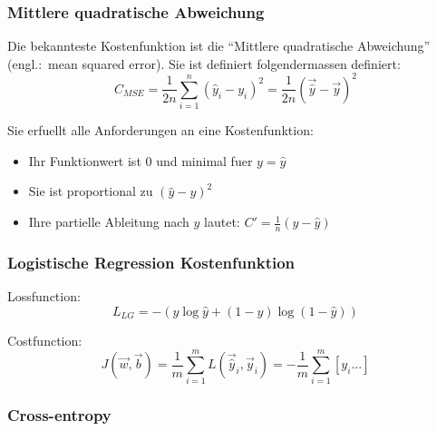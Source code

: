 \subsubsection{Mittlere quadratische Abweichung}
Die bekannteste Kostenfunktion ist die ``Mittlere quadratische Abweichung''
(engl.:\ mean squared error).
Sie ist definiert folgendermassen definiert:
\begin{equation}
  C_{MSE} = \frac{1}{2n}\sum_{i=1}^{n}{(\hat{y}_i - y_i)}^2 = \frac{1}{2n}{(\vec{\hat{y}} - \vec{y})}^2
\end{equation}

Sie erfuellt alle Anforderungen an eine Kostenfunktion:
\begin{itemize}
\item{Ihr Funktionwert ist 0 und minimal fuer $y = \hat{y}$}
\item{Sie ist proportional zu ${(\hat{y}-y)}^2$}
\item{Ihre partielle Ableitung nach $y$ lautet: $C'=\frac{1}{n}(y-\hat{y})$}
\end{itemize}

\subsubsection{Logistische Regression Kostenfunktion}

Lossfunction:
\begin{equation}
  L_{LG} = -(y \log \hat{y} + (1-y) \log (1-\hat{y}))
\end{equation}

Costfunction:
\begin{equation}
  J(\vec{w},\vec{b}) = \frac{1}{m} \sum_{i=1}^m L(\vec{\hat{y}}_i,\vec{y}_i) = - \frac{1}{m} \sum_{i=1}^m \left[ y_i...  \right]
\end{equation}



\subsubsection{Cross-entropy}


